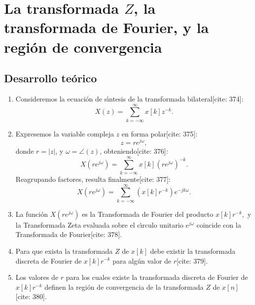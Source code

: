 \section{La transformada $Z$, la transformada de Fourier, y la regi\'{o}n de convergencia} \label{zetaconv}

\subsection{Desarrollo te\'{o}rico}

\begin{enumerate}
	\item Consideremos la ecuaci\'{o}n de s\'{\i}ntesis de la transformada bilateral[cite: 374]:
	\begin{equation}
		X(z) = \sum_{k=-\infty}^{\infty} x[k] z^{-k}.
	\end{equation}
	
	\item Expresemos la variable compleja $z$ en forma polar[cite: 375]:
	\begin{equation}
		z = r e^{j \omega},
	\end{equation}
	donde $r = |z|$, y $\omega = \angle(z)$, obteniendo[cite: 376]:
	\begin{equation}
		X(r e^{j \omega}) = \sum_{k=-\infty}^{\infty} x[k] (r e^{j \omega})^{-k}.
	\end{equation}
	Reagrupando factores, resulta finalmente[cite: 377]:
	\begin{equation}
		X(r e^{j \omega}) = \sum_{k=-\infty}^{\infty} \left( x[k] r^{-k} \right) e^{-j k \omega}.
	\end{equation}
	
	\item La funci\'{o}n $X(r e^{j \omega})$ es la Transformada de Fourier del producto $x[k] r^{-k},$ y la Transformada Zeta evaluada sobre el c\'{\i}rculo unitario $e^{j \omega}$ coincide con la Transformada de Fourier[cite: 378].
	\item Para que exista la transformada $Z$ de $x[k]$ debe existir la transformada discreta de Fourier de $x[k] r^{-k}$ para alg\'{u}n valor de $r$[cite: 379].
	\item Los valores de $r$ para los cuales existe la transformada discreta de Fourier de $x[k] r^{-k}$ definen la regi\'{o}n de convergencia de la transformada $Z$ de $x[n]$[cite: 380].
	

\end{enumerate}
